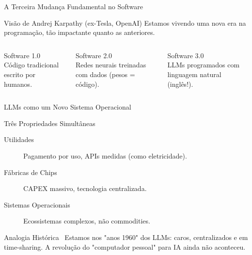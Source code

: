 \documentclass[aspectratio=169,12pt]{beamer}
\begin{document}
\begin{frame}{A Terceira Mudança Fundamental no Software}
    \begin{block}{Visão de Andrej Karpathy (ex-Tesla, OpenAI)}
        \centering
        Estamos vivendo uma nova era na programação, tão impactante quanto as anteriores.
    \end{block}
    
    \begin{columns}[T]
        \begin{column}{0.33\textwidth}
            \begin{block}{Software 1.0}
                \faCode\\
                Código tradicional escrito por humanos.
            \end{block}
        \end{column}
        \begin{column}{0.33\textwidth}
            \begin{block}{Software 2.0}
                \faSitemap\\
                Redes neurais treinadas com dados (pesos = código).
            \end{block}
        \end{column}
        \begin{column}{0.33\textwidth}
            \begin{exampleblock}{Software 3.0}
                \faComments\\
                LLMs programados com linguagem natural (inglês!).
            \end{exampleblock}
        \end{column}
    \end{columns}
\end{frame}

\begin{frame}{LLMs como um Novo Sistema Operacional}
    \begin{block}{Três Propriedades Simultâneas}
        \begin{description}
            \item[\textcolor{accent}{\faBolt} Utilidades] Pagamento por uso, APIs medidas (como eletricidade).
            \item[\textcolor{secondary}{\faMicrochip} Fábricas de Chips] CAPEX massivo, tecnologia centralizada.
            \item[\textcolor{success}{\faDesktop} Sistemas Operacionais] Ecossistemas complexos, não commodities.
        \end{description}
    \end{block}

    \begin{alertblock}{Analogia Histórica}
        \faCalendar\, Estamos nos "anos 1960" dos LLMs: caros, centralizados e em time-sharing. A revolução do "computador pessoal" para IA ainda não aconteceu.
    \end{alertblock}
\end{frame}
\end{document}
